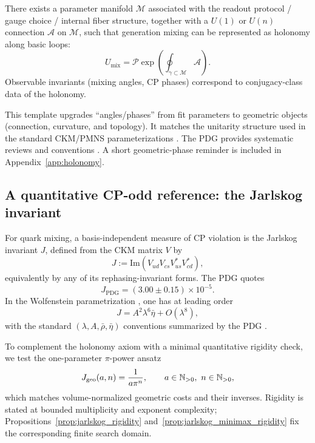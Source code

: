 \begin{axiom}
\label{ax:mixing_holonomy}
There exists a parameter manifold $\mathcal{M}$ associated with the readout protocol / gauge choice / internal fiber structure, together with a $U(1)$ or $U(n)$ connection $\mathcal{A}$ on $\mathcal{M}$, such that generation mixing can be represented as holonomy along basic loops:
\begin{equation}
U_{\mathrm{mix}}=\mathcal{P}\exp\!\left(\oint_{\gamma\subset\mathcal{M}} \mathcal{A}\right).
\end{equation}
Observable invariants (mixing angles, CP phases) correspond to conjugacy-class data of the holonomy.
\end{axiom}

This template upgrades ``angles/phases'' from fit parameters to geometric objects (connection, curvature, and topology). It matches the unitarity structure used in the standard CKM/\allowbreak PMNS parameterizations \cite{Cabibbo1963,KobayashiMaskawa1973,Pontecorvo1957,MakiNakagawaSakata1962}. The PDG provides systematic reviews and conventions \cite{PDGRPP2024}. A short geometric-phase reminder is included in Appendix~\ref{app:holonomy}.

\subsection{A quantitative CP-odd reference: the Jarlskog invariant}
For quark mixing, a basis-independent measure of CP violation is the Jarlskog invariant $J$, defined from the CKM matrix $V$ by \cite{Jarlskog1985}
\begin{equation}
J:=\mathrm{Im}\!\left(V_{ud}V_{cs}V_{us}^\ast V_{cd}^\ast\right),
\end{equation}
equivalently by any of its rephasing-invariant forms. The PDG quotes \cite{PDGRPP2024}
\begin{equation}
J_{\mathrm{PDG}}=(3.00\pm 0.15)\times 10^{-5}.
\end{equation}
In the Wolfenstein parametrization \cite{Wolfenstein1983}, one has at leading order
\begin{equation}\label{eq:jarlskog_wolfenstein}
J=A^2\lambda^6\bar{\eta}+O(\lambda^8),
\end{equation}
with the standard $(\lambda,A,\bar{\rho},\bar{\eta})$ conventions summarized by the PDG \cite{PDGRPP2024}.

To complement the holonomy axiom with a minimal quantitative rigidity check, we test the one-parameter $\pi$-power ansatz
\begin{equation}\label{eq:jarlskog_pi_ansatz}
J_{\mathrm{geo}}(a,n)=\frac{1}{a\pi^n},\qquad a\in\NNpos,\ n\in\NNpos,
\end{equation}
which matches volume-normalized geometric costs and their inverses.
Rigidity is stated at bounded multiplicity and exponent complexity; Propositions~\ref{prop:jarlskog_rigidity} and~\ref{prop:jarlskog_minimax_rigidity} fix the corresponding finite search domain.

